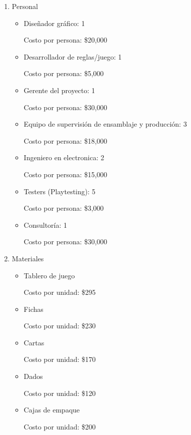 \documentclass[12pt]{article}
\begin{document}
\begin{enumerate}
	\item Personal

	\begin{itemize}
		\item Diseñador gráfico: 1 

		Costo por persona: \$20,000

		\item Desarrollador de reglas/juego: 1

		Costo por persona: \$5,000

		\item Gerente del proyecto: 1

		Costo por persona: \$30,000

		\item Equipo de supervisión de ensamblaje y producción:  3

		Costo por persona: \$18,000

		\item Ingeniero en electronica: 2

		Costo por persona: \$15,000

		\item Testers (Playtesting): 5

		Costo por persona: \$3,000

		\item Consultoría: 1

		Costo por persona: \$30,000

	\end{itemize}

	\item Materiales 

	\begin{itemize}
		\item Tablero de juego

		Costo por unidad: \$295

		\item Fichas

		Costo por unidad: \$230

		\item Cartas

		Costo por unidad: \$170

		\item Dados

		Costo por unidad: \$120

		\item Cajas de empaque

		Costo por unidad: \$200
	\end{itemize}


\end{enumerate}
\end{document}
